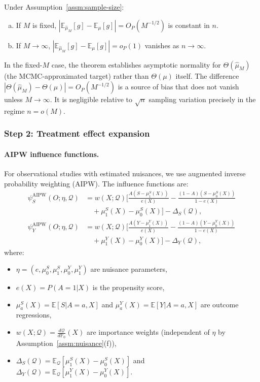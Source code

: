 \begin{corollary}
\label{cor:mcmc-negligible}
Under Assumption~\ref{assm:sample-size}:
\begin{enumerate}[(a)]
\item If $M$ is fixed, $|\mathbb{E}_{\hat{\mu}_M}[g] - \mathbb{E}_{\mu}[g]| = O_P(M^{-1/2})$ is constant in $n$.
\item If $M \to \infty$, $|\mathbb{E}_{\hat{\mu}_M}[g] - \mathbb{E}_{\mu}[g]| = o_P(1)$ vanishes as $n \to \infty$.
\end{enumerate}
\end{corollary}

\begin{remark}
In the fixed-$M$ case, the theorem establishes asymptotic normality for $\Theta(\hat{\mu}_M)$ (the MCMC-approximated target) rather than $\Theta(\mu)$ itself. The difference $|\Theta(\hat{\mu}_M) - \Theta(\mu)| = O_P(M^{-1/2})$ is a source of bias that does not vanish unless $M \to \infty$. It is negligible relative to $\sqrt{n}$ sampling variation precisely in the regime $n = o(M)$.
\end{remark}

\subsubsection{Step 2: Treatment effect expansion}

\paragraph{AIPW influence functions.}
For observational studies with estimated nuisances, we use augmented inverse probability weighting (AIPW). The influence functions are:
\begin{align}
\psi_S^{\text{AIPW}}(O; \eta, \mathcal{Q}) &= w(X; \mathcal{Q}) \Bigg[\frac{A(S - \mu_1^S(X))}{e(X)} - \frac{(1-A)(S - \mu_0^S(X))}{1-e(X)} \nonumber \\
&\quad + \mu_1^S(X) - \mu_0^S(X)\Bigg] - \Delta_S(\mathcal{Q}), \label{eq:aipw-s} \\
\psi_Y^{\text{AIPW}}(O; \eta, \mathcal{Q}) &= w(X; \mathcal{Q}) \Bigg[\frac{A(Y - \mu_1^Y(X))}{e(X)} - \frac{(1-A)(Y - \mu_0^Y(X))}{1-e(X)} \nonumber \\
&\quad + \mu_1^Y(X) - \mu_0^Y(X)\Bigg] - \Delta_Y(\mathcal{Q}), \label{eq:aipw-y}
\end{align}
where:
\begin{itemize}
\item $\eta = (e, \mu_0^S, \mu_1^S, \mu_0^Y, \mu_1^Y)$ are nuisance parameters,
\item $e(X) = P(A=1|X)$ is the propensity score,
\item $\mu_a^S(X) = \mathbb{E}[S|A=a,X]$ and $\mu_a^Y(X) = \mathbb{E}[Y|A=a,X]$ are outcome regressions,
\item $w(X; \mathcal{Q}) = \frac{d\mathcal{Q}}{d\mathbb{P}_0}(X)$ are importance weights (independent of $\eta$ by Assumption~\ref{assm:nuisance}(f)),
\item $\Delta_S(\mathcal{Q}) = \mathbb{E}_{\mathcal{Q}}[\mu_1^S(X) - \mu_0^S(X)]$ and $\Delta_Y(\mathcal{Q}) = \mathbb{E}_{\mathcal{Q}}[\mu_1^Y(X) - \mu_0^Y(X)]$.
\end{itemize}

